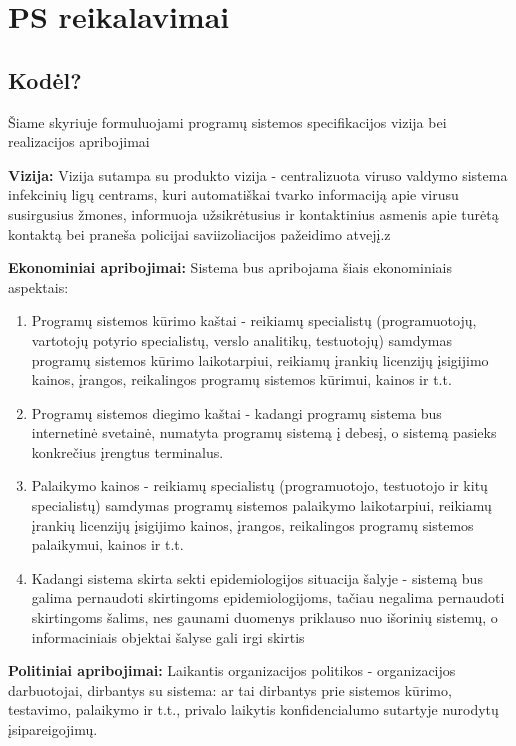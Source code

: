 \documentclass{VUMIFPSkursinis}
\begin{document}
\section{PS reikalavimai}
 
\subsection{Kodėl?}\label{sec:PSReqWhy}
Šiame skyriuje formuluojami programų sistemos specifikacijos vizija bei realizacijos apribojimai

\textbf{Vizija:} Vizija sutampa su produkto vizija - centralizuota viruso valdymo sistema infekcinių ligų centrams, kuri automatiškai tvarko informaciją apie virusu susirgusius žmones, informuoja užsikrėtusius ir kontaktinius asmenis apie turėtą kontaktą bei praneša policijai saviizoliacijos pažeidimo atvejį.z

\textbf{Ekonominiai apribojimai:}
Sistema bus apribojama šiais ekonominiais aspektais:
	\begin{enumerate}
		\item Programų sistemos kūrimo kaštai - reikiamų specialistų (programuotojų, vartotojų potyrio specialistų, verslo analitikų, testuotojų) samdymas programų sistemos kūrimo laikotarpiui, reikiamų įrankių licenzijų įsigijimo kainos, įrangos, reikalingos programų sistemos kūrimui, kainos ir t.t. 
		\item Programų sistemos diegimo kaštai - kadangi programų sistema bus internetinė svetainė, numatyta programų sistemą į debesį, o sistemą pasieks konkrečius įrengtus terminalus.
		\item Palaikymo kainos - reikiamų specialistų (programuotojo, testuotojo ir kitų specialistų) samdymas programų sistemos palaikymo laikotarpiui, reikiamų įrankių licenzijų įsigijimo kainos, įrangos, reikalingos programų sistemos palaikymui, kainos ir t.t.
		\item Kadangi sistema skirta sekti epidemiologijos situacija šalyje - sistemą bus galima pernaudoti skirtingoms epidemiologijoms, tačiau negalima pernaudoti skirtingoms šalims, nes gaunami duomenys priklauso nuo išorinių sistemų, o informaciniais objektai šalyse gali irgi skirtis 
	\end{enumerate}

\textbf{Politiniai apribojimai:} Laikantis organizacijos politikos - organizacijos darbuotojai, dirbantys su sistema: ar tai dirbantys prie sistemos kūrimo, testavimo, palaikymo ir t.t., privalo laikytis konfidencialumo sutartyje nurodytų įsipareigojimų.
\end{document}
